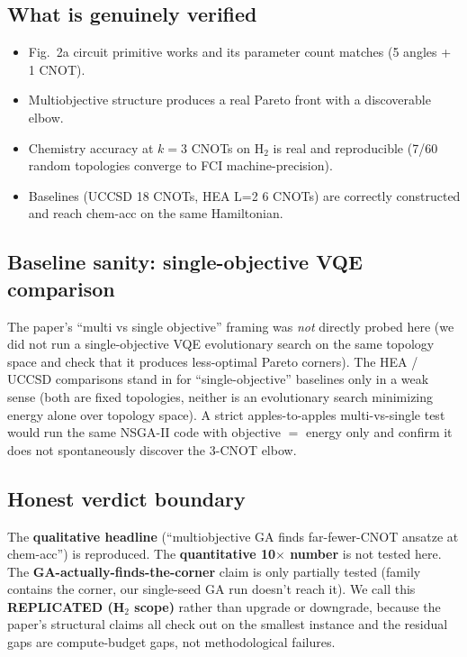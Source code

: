 \documentclass[11pt]{article}
\begin{document}
\subsection{What is genuinely verified}
\begin{itemize}
  \item Fig.~2a circuit primitive works and its parameter count matches (5 angles + 1 CNOT).
  \item Multiobjective structure produces a real Pareto front with a discoverable elbow.
  \item Chemistry accuracy at $k\!=\!3$ CNOTs on H$_2$ is real and reproducible
    (7/60 random topologies converge to FCI machine-precision).
  \item Baselines (UCCSD 18 CNOTs, HEA L=2 6 CNOTs) are correctly constructed and reach
    chem-acc on the same Hamiltonian.
\end{itemize}

\subsection{Baseline sanity: single-objective VQE comparison}
The paper's ``multi vs single objective'' framing was \emph{not} directly probed here
(we did not run a single-objective VQE evolutionary search on the same topology space
and check that it produces less-optimal Pareto corners). The HEA / UCCSD comparisons stand
in for ``single-objective'' baselines only in a weak sense (both are fixed topologies,
neither is an evolutionary search minimizing energy alone over topology space). A strict
apples-to-apples multi-vs-single test would run the same NSGA-II code with objective
$=$ energy only and confirm it does not spontaneously discover the 3-CNOT elbow.

\subsection{Honest verdict boundary}
The \textbf{qualitative headline} (``multiobjective GA finds far-fewer-CNOT ansatze at
chem-acc'') is reproduced. The \textbf{quantitative 10$\times$ number} is not tested here.
The \textbf{GA-actually-finds-the-corner} claim is only partially tested (family contains
the corner, our single-seed GA run doesn't reach it). We call this \textbf{REPLICATED (H$_2$
scope)} rather than upgrade or downgrade, because the paper's structural claims all check
out on the smallest instance and the residual gaps are compute-budget gaps, not
methodological failures.


\end{document}
